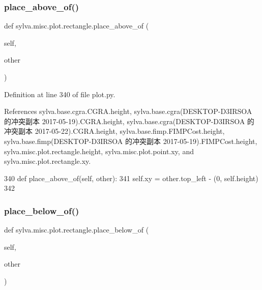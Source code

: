 \subsubsection{\texorpdfstring{place\+\_\+above\+\_\+of()}{place\_above\_of()}}
{\footnotesize\ttfamily def sylva.\+misc.\+plot.\+rectangle.\+place\+\_\+above\+\_\+of (\begin{DoxyParamCaption}\item[{}]{self,  }\item[{}]{other }\end{DoxyParamCaption})}



Definition at line 340 of file plot.\+py.



References sylva.\+base.\+cgra.\+C\+G\+R\+A.\+height, sylva.\+base.\+cgra(\+D\+E\+S\+K\+T\+O\+P-\/\+D3\+I\+R\+S\+O\+A 的冲突副本 2017-\/05-\/19).\+C\+G\+R\+A.\+height, sylva.\+base.\+cgra(\+D\+E\+S\+K\+T\+O\+P-\/\+D3\+I\+R\+S\+O\+A 的冲突副本 2017-\/05-\/22).\+C\+G\+R\+A.\+height, sylva.\+base.\+fimp.\+F\+I\+M\+P\+Cost.\+height, sylva.\+base.\+fimp(\+D\+E\+S\+K\+T\+O\+P-\/\+D3\+I\+R\+S\+O\+A 的冲突副本 2017-\/05-\/19).\+F\+I\+M\+P\+Cost.\+height, sylva.\+misc.\+plot.\+rectangle.\+height, sylva.\+misc.\+plot.\+point.\+xy, and sylva.\+misc.\+plot.\+rectangle.\+xy.


\begin{DoxyCode}
340         \textcolor{keyword}{def }place\_above\_of(self, other):
341             self.xy = other.top\_left - (0, self.height)
342 
\end{DoxyCode}
\mbox{\label{classsylva_1_1misc_1_1plot_1_1rectangle_aab959379faa71fa2fff5f1797207078b}} 
\subsubsection{\texorpdfstring{place\+\_\+below\+\_\+of()}{place\_below\_of()}}
{\footnotesize\ttfamily def sylva.\+misc.\+plot.\+rectangle.\+place\+\_\+below\+\_\+of (\begin{DoxyParamCaption}\item[{}]{self,  }\item[{}]{other }\end{DoxyParamCaption})}



